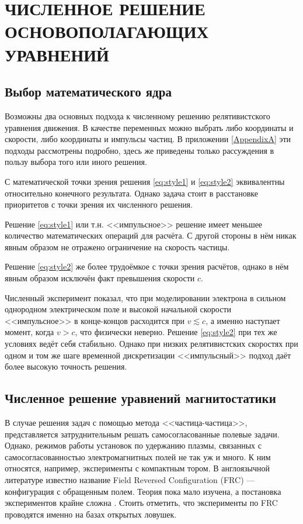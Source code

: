 \chapter{ЧИСЛЕННОЕ РЕШЕНИЕ ОСНОВОПОЛАГАЮЩИХ УРАВНЕНИЙ} \label{ch3}


\section{Выбор математического ядра}


Возможны два основных подхода к численному решению релятивистского  уравнения движения. В качестве переменных можно выбрать либо координаты и скорости, либо координаты и импульсы частиц.
В приложении \ref{AppendixA} эти подходы рассмотрены подробно, здесь же приведены только рассуждения в пользу выбора того или иного решения.

С математической точки зрения решения \eqref{eq:style1} и \eqref{eq:style2} эквивалентны относительно конечного результата. Однако задача стоит в расстановке приоритетов с точки зрения их численного решения. 

Решение \eqref{eq:style1} или т.н. <<импульсное>> решение имеет меньшее количество математических операций для расчёта. С другой стороны в нём никак явным образом не отражено ограничение на скорость частицы.

Решение \eqref{eq:style2} же более трудоёмкое с точки зрения расчётов, однако в нём явным образом исключён факт превышения скорости $c$.

Численный эксперимент показал, что при моделировании электрона в сильном однородном электрическом поле и высокой начальной скорости <<импульсное>> в конце-концов расходится при $v \lesssim c$, а именно наступает момент, когда $v>c$, что физически неверно. Решение \eqref{eq:style2} при тех же условиях ведёт себя стабильно. Однако при низких релятивистских скоростях при одном и том же шаге временной дискретизации <<импульсный>> подход даёт более высокую точность решения.




\section{Численное решение уравнений магнитостатики}

В случае решения задач с помощью метода <<частица-частица>>, представляется затруднительным решать самосогласованные полевые задачи. Однако, режимов работы установок по удержанию плазмы, связанных с самосогласованностью электромагнитных полей не так уж и много. К ним относятся, например, эксперименты с компактным тором. В англоязычной литературе известно название Field Reversed Configuration (FRC) --- конфигурация с обращенным полем. Теория пока мало изучена, а постановка экспериментов крайне сложна \cite{Steinhauer2006, Ryzhkov2015d, Intrator2004}. Стоить отметить, что эксперименты по FRC проводятся именно на базах открытых ловушек.

